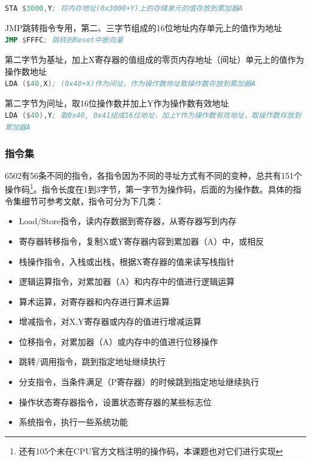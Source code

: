 \documentclass[a4paper]{ltxdoc}
\begin{document}
{\begin{description}
 \mintinline [breaklines]{asm}{STA $3000,Y; 将内存地址(0x3000+Y)上的存储单元的值存放到累加器A}
\item [间接寻址] JMP跳转指令专用，第二、三字节组成的16位地址内存单元上的值作为地址\\
 \mintinline [breaklines]{asm}{JMP $FFFC; 跳转到Reset中断向量}
\item [零页变址间接寻址]  第二字节为基址，加上X寄存器的值组成的零页内存地址（间址）单元上的值作为操作数地址\\
 \mintinline [breaklines]{asm}{LDA ($40,X); (0x40+X)作为间址，作为操作数地址取操作数存放到累加器A}
\item [间接寻址变址]  第二字节为间址，取16位操作数并加上Y作为操作数有效地址\\
 \mintinline [breaklines]{asm}{LDA ($40),Y; 取0x40, 0x41组成16位地址，加上Y作为操作数有效地址，取操作数存放到累加器A}
\end{description}


\subsubsection{指令集}
6502有56条不同的指令，各指令因为不同的寻址方式有不同的变种，总共有151个操作码\footnote{还有105个未在CPU官方文档注明的操作码，本课题也对它们进行实现}。指令长度在1到3字节，第一字节为操作码，后面的为操作数。具体的指令集细节可参考文献\cite{6502instruction}，指令可分为下几类：
\begin{itemize}
	\item Load/Store指令，读内存数据到寄存器，从寄存器写到内存
	\item 寄存器转移指令，复制X或Y寄存器内容到累加器（A）中，或相反
	\item 栈操作指令，入栈或出栈，根据X寄存器的值来读写栈指针
	\item 逻辑运算指令，对累加器（A）和内存中的值进行逻辑运算
	\item 算术运算，对寄存器和内存进行算术运算
	\item 增减指令，对X,Y寄存器或内存的值进行增减运算
	\item 位移指令，对累加器（A）或内存中的值进行位移操作
	\item 跳转/调用指令，跳到指定地址继续执行
	\item 分支指令，当条件满足（P寄存器）的时候跳到指定地址继续执行
	\item 操作状态寄存器指令，设置状态寄存器的某些标志位
	\item 系统指令，执行一些系统功能
\end{itemize}

}
\end{document}
